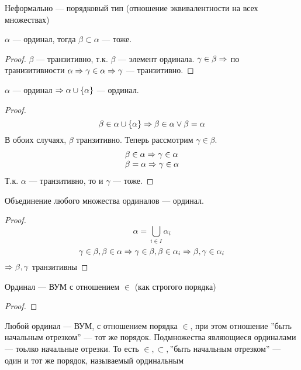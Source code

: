 Неформально --- порядковый тип (отношение эквивалентности на всех множествах)

\begin{proposition}
    \(\alpha\) --- ординал, тогда \(\beta \subset \alpha\) --- тоже.
\end{proposition}
\begin{proof}
    \(\beta\) --- транзитивно, т.к. \(\beta\) --- элемент ординала. \(\gamma \in \beta \Rightarrow\) по транизитивности \(\alpha \Rightarrow \gamma \in \alpha \Rightarrow \gamma\) --- транзитивно.
\end{proof}

\begin{proposition}
    \(\alpha\) --- ординал \(\Rightarrow \alpha \cup \{\alpha\}\) --- ординал.
\end{proposition}
\begin{proof}
    \[\beta \in \alpha \cup \{\alpha\} \Rightarrow \beta \in \alpha \vee \beta = \alpha\] 
    В обоих случаях, \(\beta\) транзитивно.
    Теперь рассмотрим \(\gamma \in \beta\). 
    \[\begin{array}{l}
        \beta \in \alpha \Rightarrow \gamma \in \alpha \\
        \beta = \alpha \Rightarrow \gamma \in \alpha
    \end{array}\]
    Т.к. \(\alpha\) --- транзитивно, то и \(\gamma\) --- тоже.
\end{proof}
\begin{proposition}
    Объединение любого множества ординалов --- ординал.
\end{proposition}
\begin{proof}
    \[\alpha = \bigcup_{i \in I}\alpha_i\]
    \[\gamma \in \beta, \beta \in \alpha \Rightarrow \gamma \in \beta, \beta \in \alpha_i \Rightarrow \beta, \gamma \in \alpha_i\]
    \(\Rightarrow \beta, \gamma\) транзитивны
\end{proof}

\begin{proposition}
    Ординал --- ВУМ с отношением \(\in\) (как строгого порядка)
\end{proposition}
\begin{proof}
    
\end{proof}

\begin{theorem}
    Любой ординал --- ВУМ, с отношением порядка \(\in\), при этом отношение ''быть начальным отрезком'' --- тот же порядок. Подмножества являющиеся ординалами --- тоьлко начальные отрезки. То есть \(\in, \subset, \text{''быть начальным отрезком''}\) --- один и тот же порядок, называемый ординальным
\end{theorem}
